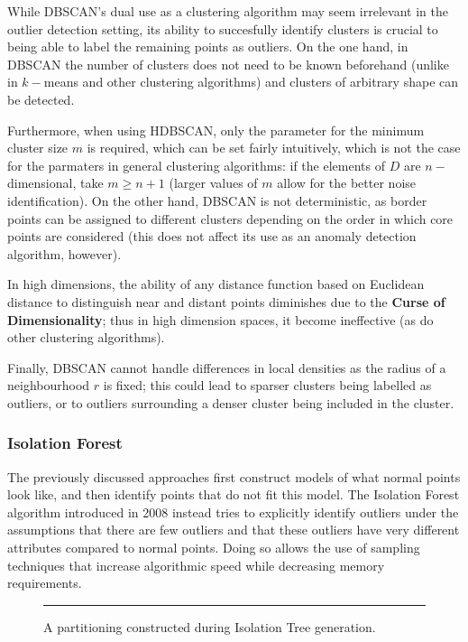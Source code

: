While DBSCAN's dual use as a clustering algorithm may seem irrelevant in the outlier detection setting,
its ability to succesfully identify clusters is crucial to being able to label the remaining points as outliers.
\newl 
On the one hand, in DBSCAN the number of clusters does not need to be known beforehand (unlike in $k-$means and other clustering algorithms) and clusters of arbitrary shape can be detected. \par Furthermore, when using HDBSCAN, only the parameter for the minimum cluster size $m$ is required, which can be set fairly intuitively, which is not the case for the parmaters in general clustering algorithms: if the elements of $D$ are $n-$dimensional, take $m\geq n+1$ (larger values of $m$ allow for the better noise identification).
\newl On the other hand, DBSCAN is not deterministic, as border points can be assigned to different clusters depending on the order in which core points are considered (this does not affect its use as an anomaly detection algorithm, however).
\par In high dimensions, the ability of any distance function based on Euclidean distance to distinguish near and distant points diminishes due to the \textbf{Curse of Dimensionality}; thus in high dimension spaces, it  become ineffective (as do  other clustering algorithms). \par  Finally, DBSCAN cannot handle differences in local densities as the radius of a neighbourhood $r$ is fixed; this could lead to sparser clusters being labelled as outliers, or to outliers surrounding a denser cluster being included in the cluster.

\subsubsection*{Isolation Forest}
The previously discussed approaches first construct models of what normal points look like, and then identify points that do not fit this model.
The Isolation Forest algorithm \cite{A15} introduced in 2008 instead tries to explicitly identify outliers under the assumptions that there are few outliers and that these outliers have very different attributes compared to normal points. Doing so allows the use of sampling techniques that increase algorithmic speed while decreasing memory requirements.
\begin{figure}[b]
\hrule \vspace{0.4cm}\centering
{}
\caption{A partitioning constructed during Isolation Tree generation.}
\label{isolationtree}
\end{figure}

